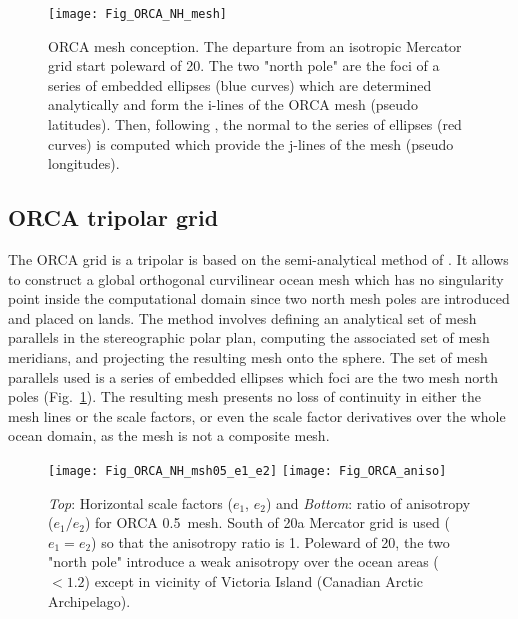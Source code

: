 \documentclass[NEMO_book]{subfiles}
\begin{document}
\begin{figure}[!t]   \begin{center}
\texttt{[image: Fig\_ORCA\_NH\_mesh]}
\caption{  \label{Fig_MISC_ORCA_msh}     
ORCA mesh conception. The departure from an isotropic Mercator grid start poleward of 20\degN.
The two "north pole" are the foci of a series of embedded ellipses (blue curves) 
which are determined analytically and form the i-lines of the ORCA mesh (pseudo latitudes). 
Then, following \citet{Madec_Imbard_CD96}, the normal to the series of ellipses (red curves) is computed 
which provide the j-lines of the mesh (pseudo longitudes).  }
\end{center}   \end{figure}

\subsection{ORCA tripolar grid}
\label{CFG_orca_grid}

The ORCA grid is a tripolar is based on the semi-analytical method of \citet{Madec_Imbard_CD96}. 
It allows to construct a global orthogonal curvilinear ocean mesh which has no singularity point inside 
the computational domain since two north mesh poles are introduced and placed on lands.
The method involves defining an analytical set of mesh parallels in the stereographic polar plan, 
computing the associated set of mesh meridians, and projecting the resulting mesh onto the sphere. 
The set of mesh parallels used is a series of embedded ellipses which foci are the two mesh north 
poles (Fig.~\ref{Fig_MISC_ORCA_msh}). The resulting mesh presents no loss of continuity in 
either the mesh lines or the scale factors, or even the scale factor derivatives over the whole 
ocean domain, as the mesh is not a composite mesh. 
\begin{figure}[!tbp]  \begin{center}
\texttt{[image: Fig\_ORCA\_NH\_msh05\_e1\_e2]}
\texttt{[image: Fig\_ORCA\_aniso]}
\caption {  \label{Fig_MISC_ORCA_e1e2}
\textit{Top}: Horizontal scale factors ($e_1$, $e_2$) and 
\textit{Bottom}: ratio of anisotropy ($e_1 / e_2$)
for ORCA 0.5\deg ~mesh. South of 20\degN a Mercator grid is used ($e_1 = e_2$) 
so that the anisotropy ratio is 1. Poleward of 20\degN, the two "north pole" 
introduce a weak anisotropy over the ocean areas ($< 1.2$) except in vicinity of Victoria Island 
(Canadian Arctic Archipelago). }
\end{center}   \end{figure}
\end{document}
